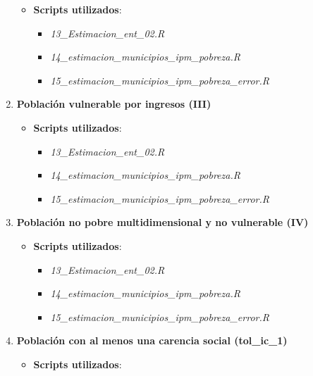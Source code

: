 \documentclass[
  12pt,
]{book}
\providecommand{\tightlist}{%
  \setlength{\itemsep}{0pt}\setlength{\parskip}{0pt}}
\begin{document}
\begin{enumerate}
  \begin{itemize}
  \tightlist
  \item
    \textbf{Scripts utilizados}:

    \begin{itemize}
    \tightlist
    \item
      \emph{13\_Estimacion\_ent\_02.R}
    \item
      \emph{14\_estimacion\_municipios\_ipm\_pobreza.R}
    \item
      \emph{15\_estimacion\_municipios\_ipm\_pobreza\_error.R}
    \end{itemize}
  \end{itemize}
\item
  \textbf{Población vulnerable por ingresos (III)}

  \begin{itemize}
  \tightlist
  \item
    \textbf{Scripts utilizados}:

    \begin{itemize}
    \tightlist
    \item
      \emph{13\_Estimacion\_ent\_02.R}
    \item
      \emph{14\_estimacion\_municipios\_ipm\_pobreza.R}
    \item
      \emph{15\_estimacion\_municipios\_ipm\_pobreza\_error.R}
    \end{itemize}
  \end{itemize}
\item
  \textbf{Población no pobre multidimensional y no vulnerable (IV)}

  \begin{itemize}
  \tightlist
  \item
    \textbf{Scripts utilizados}:

    \begin{itemize}
    \tightlist
    \item
      \emph{13\_Estimacion\_ent\_02.R}
    \item
      \emph{14\_estimacion\_municipios\_ipm\_pobreza.R}
    \item
      \emph{15\_estimacion\_municipios\_ipm\_pobreza\_error.R}
    \end{itemize}
  \end{itemize}
\item
  \textbf{Población con al menos una carencia social (tol\_ic\_1)}

  \begin{itemize}
  \tightlist
  \item
    \textbf{Scripts utilizados}:


\end{itemize}
\end{enumerate}
\end{document}
